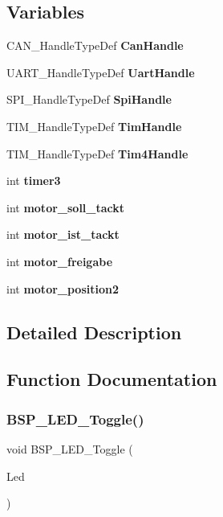 \subsection*{Variables}
\begin{DoxyCompactItemize}
\item 
C\+A\+N\+\_\+\+Handle\+Type\+Def \textbf{ Can\+Handle}
\item 
U\+A\+R\+T\+\_\+\+Handle\+Type\+Def \textbf{ Uart\+Handle}
\item 
S\+P\+I\+\_\+\+Handle\+Type\+Def \textbf{ Spi\+Handle}
\item 
T\+I\+M\+\_\+\+Handle\+Type\+Def \textbf{ Tim\+Handle}
\item 
T\+I\+M\+\_\+\+Handle\+Type\+Def \textbf{ Tim4\+Handle}
\item 
int \textbf{ timer3}
\item 
int \textbf{ motor\+\_\+soll\+\_\+tackt}
\item 
int \textbf{ motor\+\_\+ist\+\_\+tackt}
\item 
int \textbf{ motor\+\_\+freigabe}
\item 
int \textbf{ motor\+\_\+position2}
\end{DoxyCompactItemize}


\subsection{Detailed Description}


\subsection{Function Documentation}
\mbox{\label{group___c_a_n___networking_ga1b9eabba7d498f41d6f16587ec0f9732}} 
\subsubsection{B\+S\+P\+\_\+\+L\+E\+D\+\_\+\+Toggle()}
{\footnotesize\ttfamily void B\+S\+P\+\_\+\+L\+E\+D\+\_\+\+Toggle (\begin{DoxyParamCaption}\item[{\textbf{ Led\+\_\+\+Type\+Def}}]{Led }\end{DoxyParamCaption})}

